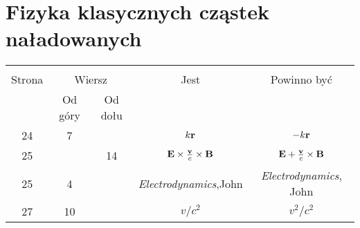 \documentclass[a4paper,11pt]{article}
\begin{document}
\section{Fizyka klasycznych cząstek naładowanych}

\vspace{\spaceTwo}


















\begin{center}

  \begin{tabular}{|c|c|c|c|c|}
    \hline
    & \multicolumn{2}{c|}{} & & \\
    Strona & \multicolumn{2}{c|}{Wiersz} & Jest & Powinno być \\ \cline{2-3}
    & Od góry & Od dołu &  &  \\ \hline
    24 & 7 & & $k \mathbf{r}$ & $-k \mathbf{r}$ \\
    25 & & 14 & $\mathbf{E} \times \frac{ \mathbf{v} }{ c } \times \mathbf{B}$
           & $\mathbf{E} + \frac{ \mathbf{v} }{ c } \times \mathbf{B}$ \\
    25 & 4 & & \textit{Electrodynamics},John
           & \textit{Electrodynamics}, John \\
    27 & 10 & & $v / c^{ 2 }$ & $v^{ 2 } / c^{ 2 }$ \\
    \hline
  \end{tabular}

\end{center}


\vspace{\spaceTwo}











{}






\end{document}
